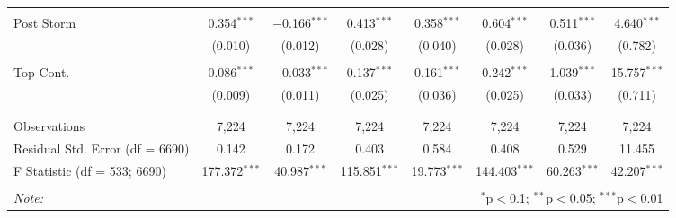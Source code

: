 \begin{table}[!htbp]
\begin{tabular}{@{\extracolsep{5pt}}lccccccc}
  & & & & & & & \\ 
 Post Storm & 0.354$^{***}$ & $-$0.166$^{***}$ & 0.413$^{***}$ & 0.358$^{***}$ & 0.604$^{***}$ & 0.511$^{***}$ & 4.640$^{***}$ \\ 
  & (0.010) & (0.012) & (0.028) & (0.040) & (0.028) & (0.036) & (0.782) \\ 
  & & & & & & & \\ 
 Top Cont. & 0.086$^{***}$ & $-$0.033$^{***}$ & 0.137$^{***}$ & 0.161$^{***}$ & 0.242$^{***}$ & 1.039$^{***}$ & 15.757$^{***}$ \\ 
  & (0.009) & (0.011) & (0.025) & (0.036) & (0.025) & (0.033) & (0.711) \\ 
  & & & & & & & \\ 
\hline \\[-1.8ex] 
Observations & 7,224 & 7,224 & 7,224 & 7,224 & 7,224 & 7,224 & 7,224 \\ 
Residual Std. Error (df = 6690) & 0.142 & 0.172 & 0.403 & 0.584 & 0.408 & 0.529 & 11.455 \\ 
F Statistic (df = 533; 6690) & 177.372$^{***}$ & 40.987$^{***}$ & 115.851$^{***}$ & 19.773$^{***}$ & 144.403$^{***}$ & 60.263$^{***}$ & 42.207$^{***}$ \\ 
\hline 
\hline \\[-1.8ex] 
\textit{Note:}  & \multicolumn{7}{r}{$^{*}$p$<$0.1; $^{**}$p$<$0.05; $^{***}$p$<$0.01} \\ 
\end{tabular} 
\end{table} 
